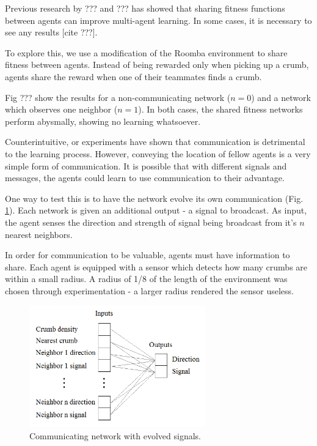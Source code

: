 \documentclass[conference]{IEEEtran}
\begin{document}
Previous research by ??? and ??? has showed that sharing fitness functions between agents can improve multi-agent learning. In some cases, it is necessary to see any results [cite ???].

To explore this, we use a modification of the Roomba environment to share fitness between agents. Instead of being rewarded only when picking up a crumb, agents share the reward when one of their teammates finds a crumb. 

Fig ??? show the results for a non-communicating network ($n=0$) and a network which observes one neighbor ($n=1$). In both cases, the shared fitness networks perform abysmally, showing no learning whatsoever.


Counterintuitive, or experiments have shown that communication is detrimental to the learning process.
However, conveying the location of fellow agents is a very simple form of communication. It is possible that with different signals and messages, the agents could learn to use communication to their advantage.

One way to test this is to have the network evolve its own communication (Fig. \ref{neroevolution:evolved_comunication}). Each network is given an additional output - a signal to broadcast. As input, the agent senses the direction and strength of signal being broadcast from it's $n$ nearest neighbors. 

In order for communication to be valuable, agents must have information to share. 
Each agent is equipped with a sensor which detects how many crumbs are within a small radius. A radius of 1/8 of the length of the environment was chosen through experimentation - a larger radius rendered the sensor useless.

\begin{figure}[t]
\centering
\includegraphics[width=3.0in]{./figures/neroevolution/emerg_comm_network.png}
\caption{Communicating network with evolved signals.}
\label{neroevolution:evolved_comunication}
\end{figure}
\end{document}
